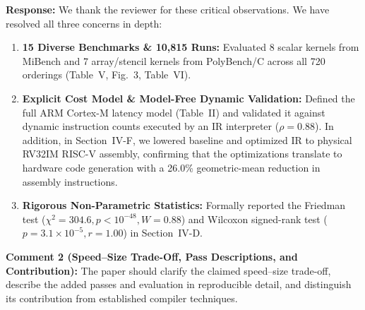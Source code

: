 \documentclass[10pt,a4paper]{article}
\begin{document}
\noindent \textbf{Response:} We thank the reviewer for these critical observations. We have resolved all three concerns in depth:
\begin{enumerate}[itemsep=1pt,parsep=0pt,topsep=2pt]
    \item \textbf{15 Diverse Benchmarks \& 10,815 Runs:} Evaluated 8 scalar kernels from MiBench and 7 array/stencil kernels from PolyBench/C across all 720 orderings (Table~V, Fig.~3, Table~VI).
    \item \textbf{Explicit Cost Model \& Model-Free Dynamic Validation:} Defined the full ARM Cortex-M latency model (Table~II) and validated it against dynamic instruction counts executed by an IR interpreter ($\rho = 0.88$). In addition, in Section~IV-F, we lowered baseline and optimized IR to physical RV32IM RISC-V assembly, confirming that the optimizations translate to hardware code generation with a 26.0\% geometric-mean reduction in assembly instructions.
    \item \textbf{Rigorous Non-Parametric Statistics:} Formally reported the Friedman test ($\chi^2 = 304.6, p < 10^{-48}, W = 0.88$) and Wilcoxon signed-rank test ($p = 3.1 \times 10^{-5}, r = 1.00$) in Section~IV-D.
\end{enumerate}

\vspace{0.8em}
\begin{reviewercomment}
\textbf{Comment 2 (Speed--Size Trade-Off, Pass Descriptions, and Contribution):} The paper should clarify the claimed speed--size trade-off, describe the added passes and evaluation in reproducible detail, and distinguish its contribution from established compiler techniques.
\end{reviewercomment}
\end{document}
